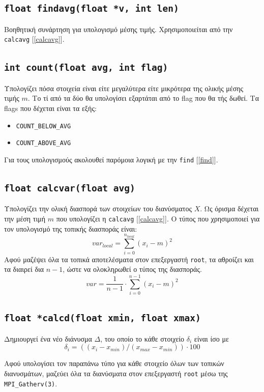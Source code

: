 \documentclass{article}
\begin{document}
\subsection{\lstinline{float findavg(float *v, int len)}}

Βοηθητική συνάρτηση για υπολογισμό μέσης τιμής. Χρησιμοποιείται από την
\lstinline{calcavg} [\ref{calcavg}].

\subsection{\lstinline{int count(float avg, int flag)}}

Υπολογίζει πόσα στοιχεία είναι είτε μεγαλύτερα είτε μικρότερα της ολικής
μέσης τιμής $m$. Το τί από τα δύο θα υπολογίσει εξαρτάται από το flag που
θα τής δωθεί. Τα flags που δέχεται είναι τα εξής:
\begin{itemize}
        \item \lstinline{COUNT_BELOW_AVG}
        \item \lstinline{COUNT_ABOVE_AVG}
\end{itemize}

Για τους υπολογισμούς ακολουθεί παρόμοια λογική με την \lstinline{find} [\ref{find}].

\subsection{\lstinline{float calcvar(float avg)}}

Υπολογίζει την ολική διασπορά των στοιχείων του διανύσματος $X$. Ως όρισμα
δέχεται την μέση τιμή $m$ που υπολογίζει η \lstinline{calcavg} [\ref{calcavg}].
Ο τύπος που χρησιμοποιεί για τον υπολογισμό της τοπικής διασποράς είναι:
\[var_{local} = \sum_{i = 0}^{n_{local}} (x_{i} - m)^2\]
Αφού μαζέψει όλα τα τοπικά αποτελέσματα στον επεξεργαστή \lstinline{root}, 
τα αθροίζει και τα διαιρεί δια $n - 1$, ώστε να ολοκληρωθεί ο τύπος της διασποράς.
\[var = \frac{1}{n - 1} \cdot \sum_{i = 0}^{n - 1} (x_i - m)^2\]

\subsection{\lstinline{float *calcd(float xmin, float xmax)}}

Δημιουργεί ένα νέο διάνυσμα $Δ$, του οποίο το κάθε στοιχείο $δ_i$ είναι ίσο
με 
\[δ_i = ((x_i - x_{min}) / (x_{max} - x_{min})) \cdot 100 \]

Αφού υπολογίσει τον παραπάνω τύπο για κάθε στοιχείο όλων των τοπικών διανυσμάτων,
μαζεύει όλα τα διανύσματα στον επεξεργαστή \lstinline{root} μέσω της
\lstinline{MPI_Gatherv(3)}.
\end{document}
